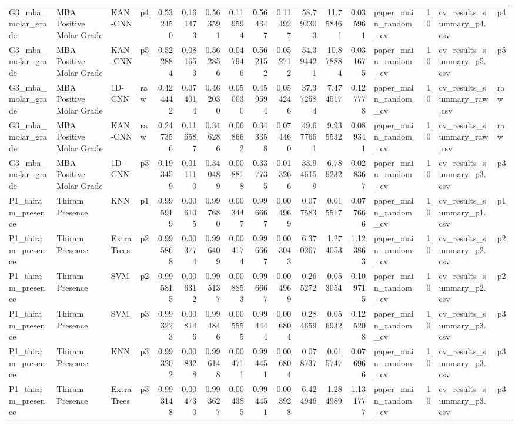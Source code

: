 \begin{tabular}{llllrrrrrrrrrlrll}
G3_mba_molar_grade & MBA Positive Molar Grade & KAN-CNN & p4 & 0.532450 & 0.161473 & 0.563591 & 0.119594 & 0.564347 & 0.114927 & 58.792303 & 11.758461 & 0.035961 & paper_main_random_cv & 10 & cv_results_summary_p4.csv & p4 \\
G3_mba_molar_grade & MBA Positive Molar Grade & KAN-CNN & p5 & 0.522884 & 0.081653 & 0.562856 & 0.047946 & 0.562152 & 0.052712 & 54.394421 & 10.878884 & 0.031675 & paper_main_random_cv & 10 & cv_results_summary_p5.csv & p5 \\
G3_mba_molar_grade & MBA Positive Molar Grade & 1D-CNN & raw & 0.424442 & 0.074014 & 0.462030 & 0.050030 & 0.459594 & 0.054246 & 37.372584 & 7.474517 & 0.127778 & paper_main_random_cv & 10 & cv_results_summary_raw.csv & raw \\
G3_mba_molar_grade & MBA Positive Molar Grade & KAN-CNN & raw & 0.247356 & 0.116587 & 0.346286 & 0.068662 & 0.343358 & 0.074460 & 49.677661 & 9.935532 & 0.089341 & paper_main_random_cv & 10 & cv_results_summary_raw.csv & raw \\
G3_mba_molar_grade & MBA Positive Molar Grade & 1D-CNN & p3 & 0.193459 & 0.011110 & 0.340489 & 0.008818 & 0.337735 & 0.013266 & 33.946159 & 6.789232 & 0.028367 & paper_main_random_cv & 10 & cv_results_summary_p3.csv & p3 \\
P1_thiram_presence & Thiram Presence & KNN & p1 & 0.995919 & 0.006105 & 0.997680 & 0.003447 & 0.996667 & 0.004969 & 0.077583 & 0.015517 & 0.077666 & paper_main_random_cv & 10 & cv_results_summary_p1.csv & p1 \\
P1_thiram_presence & Thiram Presence & ExtraTrees & p2 & 0.995868 & 0.003774 & 0.996409 & 0.004174 & 0.996667 & 0.003043 & 6.370267 & 1.274053 & 1.123863 & paper_main_random_cv & 10 & cv_results_summary_p2.csv & p2 \\
P1_thiram_presence & Thiram Presence & SVM & p2 & 0.995815 & 0.006312 & 0.995137 & 0.008853 & 0.996667 & 0.004969 & 0.265272 & 0.053054 & 0.109715 & paper_main_random_cv & 10 & cv_results_summary_p2.csv & p2 \\
P1_thiram_presence & Thiram Presence & SVM & p3 & 0.993223 & 0.008146 & 0.994846 & 0.005555 & 0.994444 & 0.006804 & 0.284659 & 0.056932 & 0.125208 & paper_main_random_cv & 10 & cv_results_summary_p3.csv & p3 \\
P1_thiram_presence & Thiram Presence & KNN & p3 & 0.993202 & 0.008328 & 0.996148 & 0.004711 & 0.994451 & 0.006804 & 0.078737 & 0.015747 & 0.076966 & paper_main_random_cv & 10 & cv_results_summary_p3.csv & p3 \\
P1_thiram_presence & Thiram Presence & ExtraTrees & p3 & 0.993148 & 0.004730 & 0.993627 & 0.004385 & 0.994451 & 0.003928 & 6.424946 & 1.284989 & 1.131777 & paper_main_random_cv & 10 & cv_results_summary_p3.csv & p3 \\

\end{tabular}

